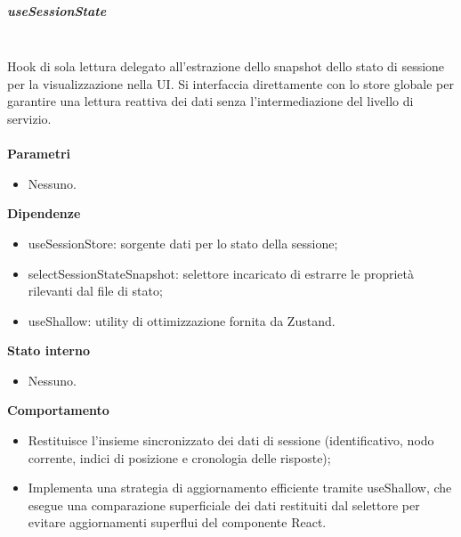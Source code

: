 \documentclass[a4paper,12pt]{article}
\begin{document}
                \subparagraph{useSessionState}\mbox{}\\
                Hook di sola lettura delegato all'estrazione dello snapshot dello stato di sessione per la visualizzazione nella UI. Si interfaccia direttamente con lo store globale per garantire una lettura reattiva dei dati senza l'intermediazione del livello di servizio.\\\\
                \textbf{Parametri}
                \begin{itemize}
                    \item Nessuno.
                \end{itemize}
                \textbf{Dipendenze}
                \begin{itemize}
                    \item {\ttfamily useSessionStore}: sorgente dati per lo stato della sessione;
                    \item {\ttfamily selectSessionStateSnapshot}: selettore incaricato di estrarre le proprietà rilevanti dal file di stato;
                    \item {\ttfamily useShallow}: utility di ottimizzazione fornita da Zustand.
                \end{itemize}
                \textbf{Stato interno}
                \begin{itemize}
                    \item Nessuno.
                \end{itemize}
                \textbf{Comportamento}
                \begin{itemize}
                    \item Restituisce l'insieme sincronizzato dei dati di sessione (identificativo, nodo corrente, indici di posizione e cronologia delle risposte);
                    \item Implementa una strategia di aggiornamento efficiente tramite {\ttfamily useShallow}, che esegue una comparazione superficiale dei dati restituiti dal selettore per evitare aggiornamenti superflui del componente React.
                \end{itemize}
                
\end{document}
